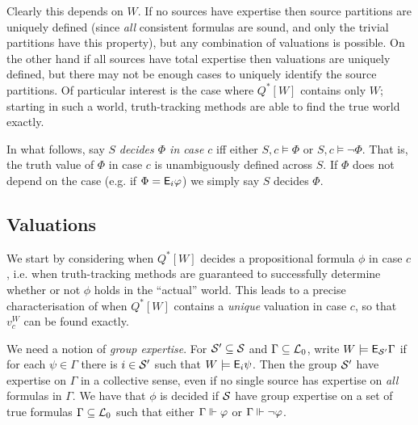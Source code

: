 Clearly this depends on $W$. If no sources have expertise then
source partitions are uniquely defined (since \emph{all} consistent formulas
are sound, and only the trivial partitions have this property), but any
combination of valuations is possible. On the other hand if all sources have
total expertise then valuations are uniquely defined, but there may not be
enough cases to uniquely identify the source partitions. Of particular interest
is the case where $Q^*[W]$ contains only $W$; starting in such a world,
truth-tracking methods are able to find the true world exactly.

In what follows, say $S$ \emph{decides $\Phi$ in case
$c$} iff either $S, c \models \Phi$ or $S, c \models \neg\Phi$. That is, the
truth value of $\Phi$ in case $c$ is unambiguously defined across $S$. If
$\Phi$ does not depend on the case (e.g. if $\Phi = \mathsf{E}_i\varphi$) we simply say
$S$ decides $\Phi$.

\subsection{Valuations}

We start by considering when $Q^*[W]$ decides a propositional formula $\phi$ in
case $c$, i.e. when truth-tracking methods are guaranteed to successfully
determine whether or not $\phi$ holds in the ``actual'' world. This leads to a
precise characterisation of when $Q^*[W]$ contains a \emph{unique} valuation in
case $c$, so that $v^W_c$ can be found exactly.

We need a notion of \emph{group expertise}. For $\mathcal{S}' \subseteq \mathcal{S}$ and
$\Gamma \subseteq \mathcal{L}_0$, write $W \models \mathsf{E}_{\mathcal{S}'}{\Gamma}$ if for each
$\psi \in \Gamma$ there is $i \in \mathcal{S}'$ such that $W \models \mathsf{E}_i\psi$. Then
the group $\mathcal{S}'$ have expertise on $\Gamma$ in a collective sense, even if no
single source has expertise on \emph{all} formulas in $\Gamma$.\footnotemark{}
%
We have that $\phi$ is decided if $\mathcal{S}$ have group expertise on a set of true
formulas $\Gamma \subseteq \mathcal{L}_0$ such that either $\Gamma \Vdash \varphi$
or $\Gamma \Vdash \neg\varphi$.


